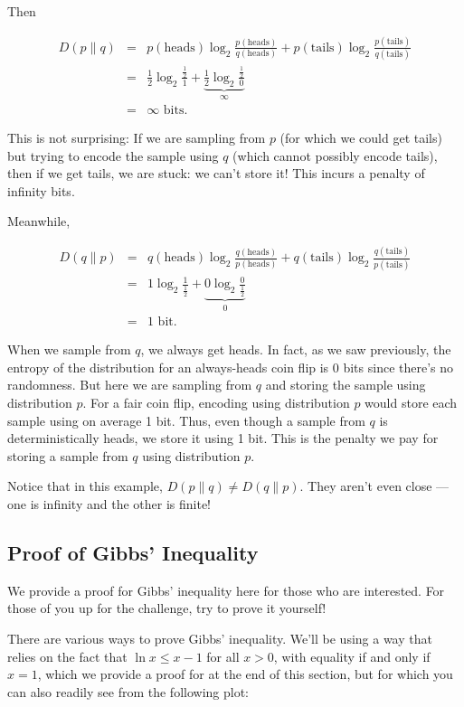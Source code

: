 \documentclass[6008notes.tex]{subfiles}
\begin{document}
Then

\begin{eqnarray*}
D(p \parallel q)
&=&
  p(\text{heads}) \log_2 \frac{p(\text{heads})}{q(\text{heads})}
+ p(\text{tails}) \log_2 \frac{p(\text{tails})}{q(\text{tails})} \\
&=&
  \frac12\log_2 \frac{\frac12}1
+ \underbrace{\frac12\log_2 \frac{\frac12}0}_{\infty} \\
&=&
  \infty\text{ bits}.
\end{eqnarray*}

This is not surprising: If we are sampling from $p$ (for which we could get tails) but trying to encode the sample using $q$ (which cannot possibly encode tails), then if we get tails, we are stuck: we can't store it! This incurs a penalty of infinity bits.

Meanwhile,

\begin{eqnarray*}
D(q \parallel p)
&=&
  q(\text{heads}) \log_2 \frac{q(\text{heads})}{p(\text{heads})}
+ q(\text{tails}) \log_2 \frac{q(\text{tails})}{p(\text{tails})} \\
&=&
  1 \log_2 \frac1{\frac12}
+ \underbrace{0 \log_2 \frac0{\frac12}}_0 \\
&=&
  1\text{ bit}.
\end{eqnarray*}

When we sample from $q$, we always get heads. In fact, as we saw previously, the entropy of the distribution for an always-heads coin flip is 0 bits since there's no randomness. But here we are sampling from $q$ and storing the sample using distribution $p$. For a fair coin flip, encoding using distribution $p$ would store each sample using on average 1 bit. Thus, even though a sample from $q$ is deterministically heads, we store it using 1 bit. This is the penalty we pay for storing a sample from $q$ using distribution $p$.

Notice that in this example, $D(p \parallel q) \ne D(q \parallel p)$. They aren't even close --- one is infinity and the other is finite!

\subsection{Proof of Gibbs' Inequality}

We provide a proof for Gibbs' inequality here for those who are interested. For those of you up for the challenge, try to prove it yourself!

There are various ways to prove Gibbs' inequality. We'll be using a way that relies on the fact that $\ln x\le x-1$ for all $x>0$, with equality if and only if $x=1$, which we provide a proof for at the end of this section, but for which you can also readily see from the following plot:
\end{document}
